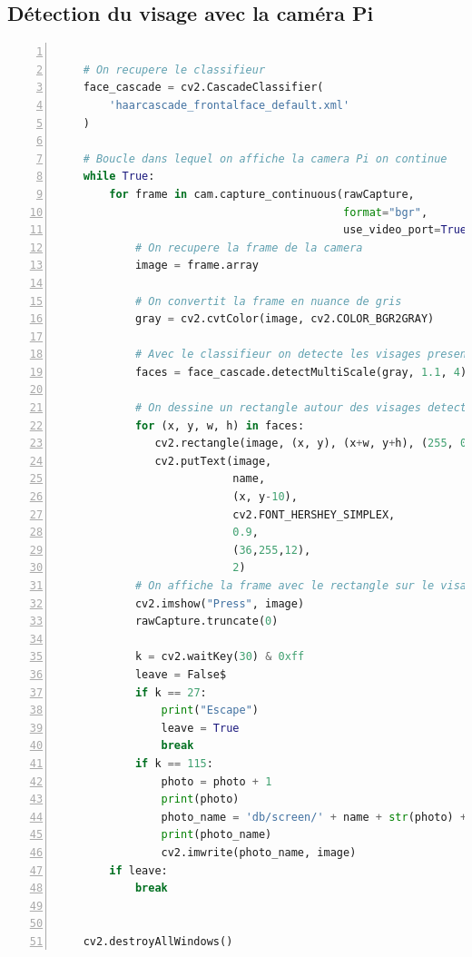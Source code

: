 \documentclass{article}
\begin{document}
\newpage
\subsection{Détection du visage avec la caméra Pi}


\begin{lstlisting}[language=python, caption={Reconnaissance faciale}, label=code:exemple, numbers=left, frame=single, framerule=1pt, linewidth=\textwidth]
    
    # On recupere le classifieur
    face_cascade = cv2.CascadeClassifier(
        'haarcascade_frontalface_default.xml'
    )

    # Boucle dans lequel on affiche la camera Pi on continue
    while True:
        for frame in cam.capture_continuous(rawCapture,
                                            format="bgr",
                                            use_video_port=True):
            # On recupere la frame de la camera
            image = frame.array

            # On convertit la frame en nuance de gris
            gray = cv2.cvtColor(image, cv2.COLOR_BGR2GRAY)
            
            # Avec le classifieur on detecte les visages presents da la frame
            faces = face_cascade.detectMultiScale(gray, 1.1, 4)
            
            # On dessine un rectangle autour des visages detecter
            for (x, y, w, h) in faces:
               cv2.rectangle(image, (x, y), (x+w, y+h), (255, 0, 0), 2)
               cv2.putText(image,
                           name,
                           (x, y-10),
                           cv2.FONT_HERSHEY_SIMPLEX,
                           0.9,
                           (36,255,12),
                           2)
            # On affiche la frame avec le rectangle sur le visage
            cv2.imshow("Press", image)
            rawCapture.truncate(0)
            
            k = cv2.waitKey(30) & 0xff
            leave = False$
            if k == 27:
                print("Escape")
                leave = True
                break
            if k == 115:
                photo = photo + 1
                print(photo)
                photo_name = 'db/screen/' + name + str(photo) + ".jpg"
                print(photo_name)
                cv2.imwrite(photo_name, image)
        if leave:
            break
        
    
    cv2.destroyAllWindows()
\end{lstlisting}
\end{document}
